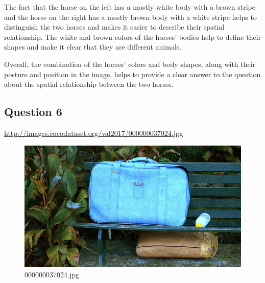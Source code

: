 \begin{enumerate}
        The fact that the horse on the left has a mostly white body with a brown stripe and the horse on the right has a mostly brown body with a white stripe helps to distinguish the two horses and makes it easier to describe their spatial relationship. The white and brown colors of the horses’ bodies help to define their shapes and make it clear that they are different animals.
        
        Overall, the combination of the horses’ colors and body shapes, along with their posture and position in the image, helps to provide a clear answer to the question about the spatial relationship between the two horses.
    \end{enumerate}
\subsection*{Question 6}
\url{http://images.cocodataset.org/val2017/000000037024.jpg}
    \begin{figure}[h]
        \centering
        \includegraphics[width=0.8\linewidth]{../image set/easy/000000037024.jpg}
        \caption{000000037024.jpg}
    \end{figure}

